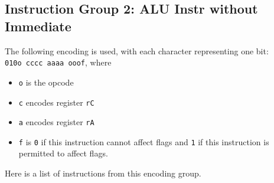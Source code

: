 \documentclass{article}
\begin{document}
	\doublespacing

	\subsection{Instruction Group 2:  ALU Instr without Immediate}
	The following encoding is used, with each character representing one
	bit:  \\
	\texttt{010o cccc aaaa ooof}, where

	\singlespacing
	\begin{itemize}
		\item \texttt{o} is the opcode
		\item \texttt{c} encodes register \texttt{rC}
		\item \texttt{a} encodes register \texttt{rA}
		\item \texttt{f} is \texttt{0} if this instruction cannot affect
		flags and \texttt{1} if this instruction is permitted to affect
		flags. 
	\end{itemize}
	\doublespacing

	Here is a list of instructions from this encoding group.
\end{document}
